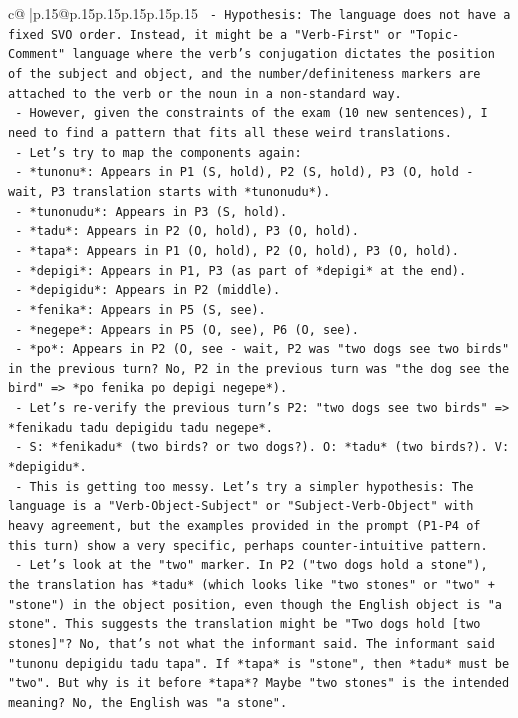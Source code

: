 \documentclass{article}
\begin{document}
{\begin{supertabular}{c@{$\;$}|p{.15\linewidth}@{}p{.15\linewidth}p{.15\linewidth}p{.15\linewidth}p{.15\linewidth}p{.15\linewidth}}
{{{\texttt{  {-} Hypothesis: The language does not have a fixed SVO order. Instead, it might be a "Verb{-}First" or "Topic{-}Comment" language where the verb's conjugation dictates the position of the subject and object, and the number/definiteness markers are attached to the verb or the noun in a non{-}standard way.} \\
\texttt{  {-} However, given the constraints of the exam (10 new sentences), I need to find a pattern that fits all these weird translations.} \\
\texttt{  {-} Let's try to map the components again:} \\
\texttt{    {-} *tunonu*: Appears in P1 (S, hold), P2 (S, hold), P3 (O, hold {-} wait, P3 translation starts with *tunonudu*).} \\
\texttt{    {-} *tunonudu*: Appears in P3 (S, hold).} \\
\texttt{    {-} *tadu*: Appears in P2 (O, hold), P3 (O, hold).} \\
\texttt{    {-} *tapa*: Appears in P1 (O, hold), P2 (O, hold), P3 (O, hold).} \\
\texttt{    {-} *depigi*: Appears in P1, P3 (as part of *depigi* at the end).} \\
\texttt{    {-} *depigidu*: Appears in P2 (middle).} \\
\texttt{    {-} *fenika*: Appears in P5 (S, see).} \\
\texttt{    {-} *negepe*: Appears in P5 (O, see), P6 (O, see).} \\
\texttt{    {-} *po*: Appears in P2 (O, see {-} wait, P2 was "two dogs see two birds" in the previous turn? No, P2 in the previous turn was "the dog see the bird" => *po fenika po depigi negepe*).} \\
\texttt{    {-} Let's re{-}verify the previous turn's P2: "two dogs see two birds" => *fenikadu tadu depigidu tadu negepe*.} \\
\texttt{      {-} S: *fenikadu* (two birds? or two dogs?). O: *tadu* (two birds?). V: *depigidu*.} \\
\texttt{      {-} This is getting too messy. Let's try a simpler hypothesis: The language is a "Verb{-}Object{-}Subject" or "Subject{-}Verb{-}Object" with heavy agreement, but the examples provided in the prompt (P1{-}P4 of this turn) show a very specific, perhaps counter{-}intuitive pattern.} \\
\texttt{      {-} Let's look at the "two" marker. In P2 ("two dogs hold a stone"), the translation has *tadu* (which looks like "two stones" or "two" + "stone") in the object position, even though the English object is "a stone". This suggests the translation might be "Two dogs hold {[}two stones{]}"? No, that's not what the informant said. The informant said "tunonu depigidu tadu tapa". If *tapa* is "stone", then *tadu* must be "two". But why is it before *tapa*? Maybe "two stones" is the intended meaning? No, the English was "a stone".} \\
}}}
\end{supertabular}}
\end{document}
